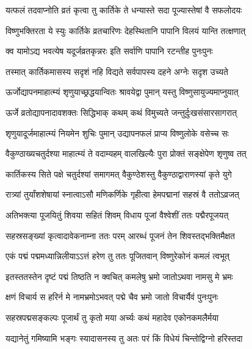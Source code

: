 \twolineshloka
{यत्फलं तदवाप्नोति व्रतं कृत्वा तु कार्तिके}
{ते धन्यास्ते सदा पूज्यास्तेषां वै सफलोदयः} %

\twolineshloka
{विष्णुभक्तिरता ये स्युः कार्तिके व्रतचारिणः}
{देहस्थितानि पापानि विलयं यान्ति तत्क्षणात्} %

\twolineshloka
{क्व यामोऽद्य भवत्येष यदूर्जव्रतकृन्नरः}
{इति सर्वाणि पापानि रटन्तीह पुनःपुनः} %

\twolineshloka
{तस्मात् कार्तिकमासस्य सदृशं नहि विद्यते}
{सर्वपापस्य दहने अग्नेः सदृश उच्यते} %

\twolineshloka
{ऊर्जोद्यापनमाहात्म्यं शृणुयाच्छ्रद्धयान्वितः}
{श्रावयेद्वा पुमान् यस्तु विष्णुसायुज्यमाप्नुयात्} %


\twolineshloka
{ऊर्जे व्रतोद्यापनादावशक्तः सिद्धिभाक् कथम्}
{कथं विमुच्यते जन्तुर्दुःखसंसारसागरात्} %


\twolineshloka
{शृणुयादूर्जमाहात्म्यं नियमेन शुचिः पुमान्}
{उद्यापनफलं प्राप्य विष्णुलोके वसेच्च सः} %





\twolineshloka
{वैकुण्ठाख्यचतुर्दश्या माहात्म्यं ते वदाम्यहम्}
{वालखिल्यैः पुरा प्रोक्तं सङ्क्षेपेण शृणुष्व तत्} %


\twolineshloka
{कार्तिकस्य सिते पक्षे चतुर्दश्यां समागमत्}
{वैकुण्ठेशस्तु वैकुण्ठाद्वाराणस्यां कृते युगे} %

\twolineshloka
{रात्र्यां तुर्यांशशेषायां स्नात्वाऽसौ मणिकर्णिके}
{गृहीत्वा हेमपद्मानां सहस्रं वै ततोऽव्रजत्} %

\twolineshloka
{अतिभक्त्या पूजयितुं शिवया सहितं शिवम्}
{विधाय पूजां वैश्वेशीं ततः पद्मैरपूजयत्} %

\twolineshloka
{सहस्रसङ्ख्यां कृत्वादावेकनाम्ना ततः परम्}
{आरब्धं पूजनं तेन शिवस्तद्भक्तिमैक्षत} %

\twolineshloka
{एकं पद्मं पद्ममध्यान्निलीयाऽऽत्तं हरेण तु}
{ततः पूजितवान् विष्णुरेकोनं कमलं त्वभूत्} %

\twolineshloka
{इतस्ततस्तेन दृष्टं पद्मं तिष्ठति न क्वचित्}
{कमलेषु भ्रमो जातोऽथवा नामसु मे भ्रमः} %

\twolineshloka
{क्षणं विचार्य स हरिर्न मे नामभ्रमोऽभवत्}
{पद्मे चैव भ्रमो जातो विचार्यैवं पुनःपुनः} %

\twolineshloka
{सहस्रपद्मसङ्कल्पः पूजार्थं तु कृतो मया}
{अर्च्यः कथं महादेव एकोनकमलैर्मया} %

\twolineshloka
{यद्यानेतुं गमिष्यामि भङ्गः स्यादासनस्य तु}
{अतः परं किं विधेयं चिन्तोद्विग्नो हरिस्तदा} %

